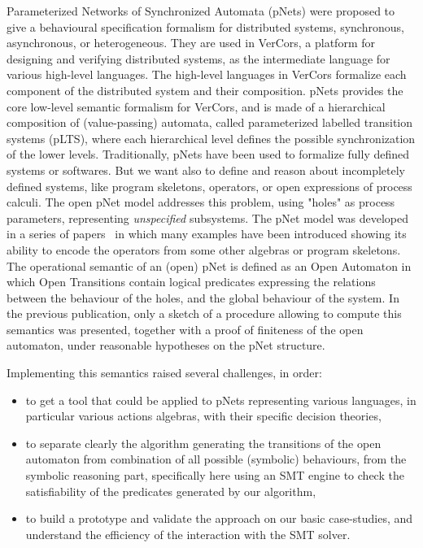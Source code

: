 \documentclass{lncs/llncs}
\begin{document}
Parameterized Networks of Synchronized Automata (pNets) were proposed
to give a behavioural specification formalism for distributed
systems, synchronous, asynchronous, or heterogeneous. They are used in
VerCors, a platform for designing and 
verifying distributed systems, as the intermediate language for various
high-level languages. The high-level languages in VerCors formalize
each component of the distributed system and their composition.
pNets provides the core low-level semantic formalism for VerCors, and
is made of a hierarchical composition of (value-passing) automata,
called parameterized labelled transition systems (pLTS), where each
hierarchical level defines the possible synchronization of the lower levels.
Traditionally, pNets have been used to formalize fully
defined systems or softwares. But we want also to define and reason
about incompletely defined systems, like program skeletons, operators,
or open expressions of process calculi.
The open pNet model addresses this problem, using
"holes" as process parameters, representing \emph{unspecified} subsystems.
The pNet model was developed in a series of
papers~\cite{HMZ:PDP15,henrio:Forte2016} in which many examples have been
introduced showing its ability to encode the operators from some
other algebras or  program skeletons.
The operational semantic of an (open) pNet is defined as an
Open Automaton in which Open Transitions contain logical predicates
expressing the relations between the behaviour of the holes, and the
global behaviour of the system. In the previous publication,
only a sketch of a procedure allowing to compute this semantics was
presented, together with a proof of finiteness of the open automaton, under
reasonable hypotheses on the pNet structure.

Implementing this semantics raised several challenges, in order:
\begin{itemize}
  \item to get a tool that could be applied to pNets representing
    various languages, in particular various actions algebras,
    with their specific decision theories,
  \item to separate clearly the 
      algorithm generating the transitions of the open automaton from
      combination of all possible (symbolic) behaviours, from
      the symbolic reasoning part, specifically here using an SMT
      engine to check the
      satisfiability of the predicates generated by our algorithm,
  \item to build a prototype and validate the approach on our basic
    case-studies, and understand the efficiency of the interaction
    with the SMT solver.
\end{itemize}
\end{document}
